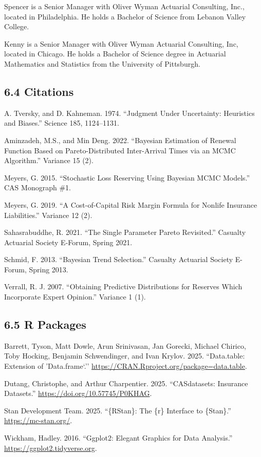 \documentclass[
]{article}
\begin{document}
Spencer is a Senior Manager with Oliver Wyman Actuarial Consulting,
Inc., located in Philadelphia. He holds a Bachelor of Science from
Lebanon Valley College.

Kenny is a Senior Manager with Oliver Wyman Actuarial Consulting, Inc,
located in Chicago. He holds a Bachelor of Science degree in Actuarial
Mathematics and Statistics from the University of Pittsburgh.

\hypertarget{citations}{%
\subsection{6.4 Citations}\label{citations}}

A. Tversky, and D. Kahneman. 1974. ``Judgment Under Uncertainty:
Heuristics and Biases.'' Science 185, 1124--1131.

Aminzadeh, M.S., and Min Deng. 2022. ``Bayesian Estimation of Renewal
Function Based on Pareto-Distributed Inter-Arrival Times via an MCMC
Algorithm.'' Variance 15 (2).

Meyers, G. 2015. ``Stochastic Loss Reserving Using Bayesian MCMC
Models.'' CAS Monograph \#1.

Meyers, G. 2019. ``A Cost-of-Capital Risk Margin Formula for Nonlife
Insurance Liabilities.'' Variance 12 (2).

Sahasrabuddhe, R. 2021. ``The Single Parameter Pareto Revisited.''
Casualty Actuarial Society E-Forum, Spring 2021.

Schmid, F. 2013. ``Bayesian Trend Selection.'' Casualty Actuarial
Society E-Forum, Spring 2013.

Verrall, R. J. 2007. ``Obtaining Predictive Distributions for Reserves
Which Incorporate Expert Opinion.'' Variance 1 (1).

\hypertarget{r-packages}{%
\subsection{6.5 R Packages}\label{r-packages}}

Barrett, Tyson, Matt Dowle, Arun Srinivasan, Jan Gorecki, Michael
Chirico, Toby Hocking, Benjamin Schwendinger, and Ivan Krylov. 2025.
``Data.table: Extension of 'Data.frame`.''
\url{https://CRAN.Rproject.org/package=data.table}.

Dutang, Christophe, and Arthur Charpentier. 2025. ``CASdatasets:
Insurance Datasets.'' \url{https://doi.org/10.57745/P0KHAG}.

Stan Development Team. 2025. ``\{RStan\}: The \{r\} Interface to
\{Stan\}.'' \url{https://mc-stan.org/}.

Wickham, Hadley. 2016. ``Ggplot2: Elegant Graphics for Data Analysis.''
\url{https://ggplot2.tidyverse.org}.
\end{document}
